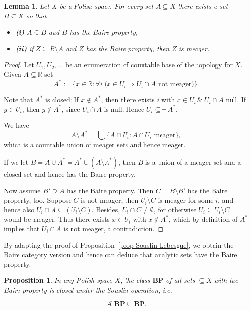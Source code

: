 \documentclass{article}
\newcommand{\Real}{\mathbb{R}}
\newcommand{\Co}[1]{\neg \, #1}
\newtheorem{lemma}[theorem]{Lemma}
\newtheorem{proposition}{Proposition}[section]
\begin{document}
\begin{lemma}\label{lem-approx-category}Let $X$ be a Polish space. For every set $A \subseteq X$ there exists a set $B \subseteq X$ so that

\begin{itemize}
\item \textbf{(i)} $A \subseteq B$ and $B$  has the Baire property,
\item \textbf{(ii)} if $Z \subseteq B \setminus A$  and $Z$ has the Baire
property, then $Z$ is meager.
\end{itemize}

\end{lemma}\begin{proof}Let  $U_1, U_2, \ldots$ be an enumeration of countable base of the
topology for $X$.
Given $A \subseteq \Real$ set
\begin{equation*}
A^*:= \{x \in \Real \colon \forall i \; ( x \in U_i \Rightarrow U_i \cap A \text{ not meager)}\}.
\end{equation*}

Note that $A^*$ is closed: If $x \not \in A^*$, then there exists $i$ with $x \in U_i \: \& \: U_i \cap A$ null. If $y \in U_i$, then $y \not \in A^*$, since $U_i \cap A$ is null.
Hence $U_i \subseteq \Co{A^*}$.

We have
\begin{equation*}
A \setminus A^* = \bigcup \{A \cap U_i \colon A \cap U_i \text{ meager}\},
\end{equation*}
which is a countable union of meager sets and hence meager.

If we let $B = A \cup A^* = A^* \cup (A \setminus A^*)$, then $B$ is a
union of a meager set and a closed set and hence has the Baire
property.

Now assume $B' \supseteq A$ has the Baire property. Then $C= B
\setminus B'$ has the Baire property, too. Suppose $C$ is not meager,
then $U_i \setminus C$ is meager for some $i$, and hence also $U_i
\cap A \subseteq (U_i \setminus C)$. Besides, $U_i \cap C \neq
\emptyset$, for otherwise $U_i \subseteq U_i \setminus C$ would be
meager. Thus there exists $x \in U_i$ with $x \not\in A^*$, which by
definition of $A^*$ implies that $U_i \cap A$ is not meager, a contradiction.

\end{proof}By adapting the proof of Proposition~\ref{prop-Souslin-Lebesgue}, we
obtain the Baire category version and hence can deduce that analytic sets
have the Baire property.

\begin{proposition}\label{prop-souslin-baire}In any Polish space $X$, the class $\mathbf{BP}$ of all sets $\subseteq X$
with the Baire property is closed under the Souslin operation, i.e.

\begin{equation}
\mathcal{A} \; \mathbf{BP} \subseteq  \mathbf{BP}.
\end{equation}

\end{proposition}
\end{document}
